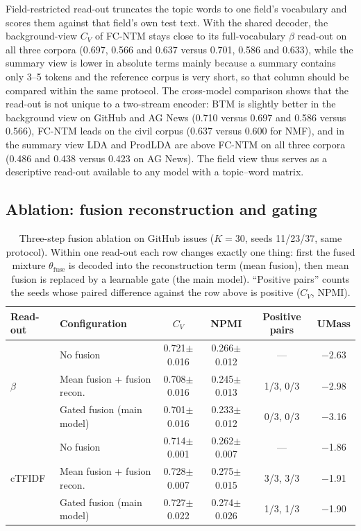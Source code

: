 \documentclass[pdflatex,sn-basic]{sn-jnl}
\newcommand{\fcntm}{FC-NTM}
\begin{document}
Field-restricted read-out truncates the topic words to one field's vocabulary and scores them
against that field's own test text. With the shared decoder, the background-view $C_V$ of
\fcntm{} stays close to its full-vocabulary $\beta$ read-out on all three corpora (0.697, 0.566
and 0.637 versus 0.701, 0.586 and 0.633), while the summary view is lower in absolute terms mainly
because a summary contains only 3--5 tokens and the reference corpus is very short, so that column
should be compared within the same protocol. The cross-model comparison shows that the
read-out is not unique to a two-stream encoder: BTM is slightly better in the background view on
GitHub and AG News (0.710 versus 0.697 and 0.586 versus 0.566), \fcntm{} leads on the civil
corpus (0.637 versus 0.600 for NMF), and in the summary view LDA and ProdLDA are above \fcntm{}
on all three corpora (0.486 and 0.438 versus 0.423 on AG News). The field view thus serves as a
descriptive read-out available to any model with a topic--word matrix.

\subsection{Ablation: fusion reconstruction and gating}

\begin{table}[t]
\centering
\caption{Three-step fusion ablation on GitHub issues ($K=30$, seeds 11/23/37, same protocol). Within one read-out each row changes exactly one thing: first the fused mixture $\theta_{\mathrm{fuse}}$ is decoded into the reconstruction term (mean fusion), then mean fusion is replaced by a learnable gate (the main model). ``Positive pairs'' counts the seeds whose paired difference against the row above is positive ($C_V$, NPMI).}
\label{tab:fusion}
\small
\begin{tabular}{llcccc}
\toprule
Read-out & Configuration & $C_V$ & NPMI & Positive pairs & UMass \\
\midrule
\multirow{3}{*}{$\beta$} & No fusion & 0.721$\pm$0.016 & 0.266$\pm$0.012 & --- & $-$2.63 \\
 & Mean fusion + fusion recon. & 0.708$\pm$0.016 & 0.245$\pm$0.013 & 1/3, 0/3 & $-$2.98 \\
 & Gated fusion (main model) & 0.701$\pm$0.016 & 0.233$\pm$0.012 & 0/3, 0/3 & $-$3.16 \\
\midrule
\multirow{3}{*}{cTFIDF} & No fusion & 0.714$\pm$0.001 & 0.262$\pm$0.007 & --- & $-$1.86 \\
 & Mean fusion + fusion recon. & 0.728$\pm$0.007 & 0.275$\pm$0.015 & 3/3, 3/3 & $-$1.91 \\
 & Gated fusion (main model) & 0.727$\pm$0.022 & 0.274$\pm$0.026 & 1/3, 1/3 & $-$1.90 \\
\bottomrule
\end{tabular}
\end{table}
\end{document}
